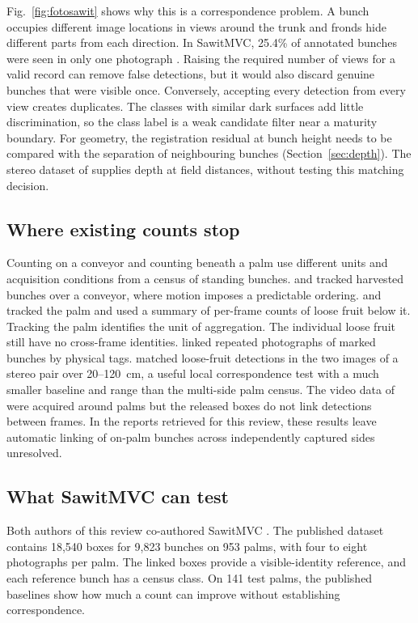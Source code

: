 Fig.~\ref{fig:fotosawit} shows why this is a correspondence problem. A bunch occupies different image locations in views around the trunk and fronds hide different parts from each direction. In SawitMVC, 25.4\% of annotated bunches were seen in only one photograph \citep{indriani2026sawitmvc}. Raising the required number of views for a valid record can remove false detections, but it would also discard genuine bunches that were visible once. Conversely, accepting every detection from every view creates duplicates. The classes with similar dark surfaces add little discrimination, so the class label is a weak candidate filter near a maturity boundary. For geometry, the registration residual at bunch height needs to be compared with the separation of neighbouring bunches (Section~\ref{sec:depth}). The stereo dataset of \citet{goh2025outdoor} supplies depth at field distances, without testing this matching decision.

\subsection{Where existing counts stop}

Counting on a conveyor and counting beneath a palm use different units and acquisition conditions from a census of standing bunches. \citet{shiddiq2023counting} and \citet{aji2021automatic} tracked harvested bunches over a conveyor, where motion imposes a predictable ordering. \citet{daud2022loose} and \citet{daud2023detection} tracked the palm and used a summary of per-frame counts of loose fruit below it. Tracking the palm identifies the unit of aggregation. The individual loose fruit still have no cross-frame identities. \citet{kassim2012oil} linked repeated photographs of marked bunches by physical tags. \citet{warni2026stereo} matched loose-fruit detections in the two images of a stereo pair over 20--120~cm, a useful local correspondence test with a much smaller baseline and range than the multi-side palm census. The video data of \citet{suharjito2025oil} were acquired around palms but the released boxes do not link detections between frames. In the reports retrieved for this review, these results leave automatic linking of on-palm bunches across independently captured sides unresolved.

\subsection{What SawitMVC can test}

Both authors of this review co-authored SawitMVC \citep{indriani2026sawitmvc}. The published dataset contains 18{,}540 boxes for 9{,}823 bunches on 953 palms, with four to eight photographs per palm. The linked boxes provide a visible-identity reference, and each reference bunch has a census class. On 141 test palms, the published baselines show how much a count can improve without establishing correspondence.

